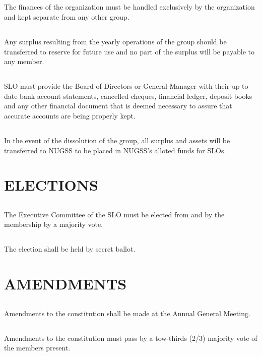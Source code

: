 \documentclass{article}
\begin{document}
\subsection{}
The finances of the organization must be handled exclusively by the organization and kept separate from any other group.
\subsection{}
Any surplus resulting from the yearly operations of the group should be transferred to reserve for future use and no part of the surplus will be payable to any member.
\subsection{}
SLO must provide the Board of Directors or General Manager with their up to date bank account statements, cancelled cheques, financial ledger, deposit books and any other financial document that is deemed necessary to assure that accurate accounts are being properly kept.
\subsection{}
In the event of the dissolution of the group, all surplus and assets will be transferred to NUGSS to be placed in NUGSS's alloted funds for SLOs.
\section{ELECTIONS}
\subsection{}
The Executive Committee of the SLO must be elected from and by the membership by a majority vote.
\subsection{}
The election shall be held by secret ballot.
\section{AMENDMENTS}
\subsection{}
Amendments to the constitution shall be made at the Annual General Meeting.
\subsection{}
Amendments to the constitution must pass by a tow-thirds (2/3) majority vote of the members present.
\end{document}
